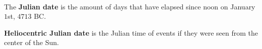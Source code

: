 \documentclass{article}
\begin{document}
\begin{example}
\

The \textbf{Julian date} is the amount of days that have elapsed since noon on January $1$st, $4713$ BC.

\textbf{Heliocentric Julian date} is the Julian time of events if they were seen from the center of the Sun.   
\end{example}

\begin{theorem}
\


\end{theorem}
\end{document}

